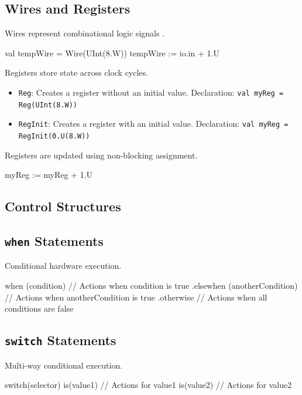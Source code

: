 \subsection{Wires and Registers}
Wires represent combinational logic signals \cite{chisel-doc}.
\begin{chiselcode}
val tempWire = Wire(UInt(8.W))
tempWire := io.in + 1.U    
\end{chiselcode}

Registers store state across clock cycles.
\begin{itemize}
    \item \texttt{Reg}: Creates a register without an initial value.
        \newline Declaration: \texttt{val myReg = Reg(UInt(8.W))}
    \item \texttt{RegInit}: Creates a register with an initial value.
        \newline Declaration: \texttt{val myReg = RegInit(0.U(8.W))}
\end{itemize}

Registers are updated using non-blocking assignment.
\begin{chiselcode}
myReg := myReg + 1.U    
\end{chiselcode}

\subsection{Control Structures}

\subsection{\texttt{when} Statements}
Conditional hardware execution.
\begin{chiselcode}
when (condition) {
  // Actions when condition is true
} .elsewhen (anotherCondition) {
  // Actions when anotherCondition is true
} .otherwise {
  // Actions when all conditions are false
}
\end{chiselcode}

\subsection{\texttt{switch} Statements}
Multi-way conditional execution.
\begin{chiselcode}
switch(selector) {
  is(value1) {
    // Actions for value1
  }
  is(value2) {
    // Actions for value2
  }
}
\end{chiselcode}

